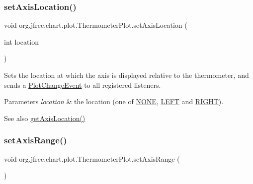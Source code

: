 \subsubsection{\texorpdfstring{set\+Axis\+Location()}{setAxisLocation()}}
{\footnotesize\ttfamily void org.\+jfree.\+chart.\+plot.\+Thermometer\+Plot.\+set\+Axis\+Location (\begin{DoxyParamCaption}\item[{int}]{location }\end{DoxyParamCaption})}

Sets the location at which the axis is displayed relative to the thermometer, and sends a \mbox{\hyperlink{}{Plot\+Change\+Event}} to all registered listeners.


\begin{DoxyParams}{Parameters}
{\em location} & the location (one of \mbox{\hyperlink{classorg_1_1jfree_1_1chart_1_1plot_1_1_thermometer_plot_a5c5c2eaa1e5ec2630b9eb6e7735c4935}{N\+O\+NE}}, \mbox{\hyperlink{classorg_1_1jfree_1_1chart_1_1plot_1_1_thermometer_plot_aad7899a73457ebc2310a5df7d51c626a}{L\+E\+FT}} and \mbox{\hyperlink{classorg_1_1jfree_1_1chart_1_1plot_1_1_thermometer_plot_a2010a6ea7e1a8a5b523673d169b86a5d}{R\+I\+G\+HT}}).\\
\hline
\end{DoxyParams}
\begin{DoxySeeAlso}{See also}
\mbox{\hyperlink{classorg_1_1jfree_1_1chart_1_1plot_1_1_thermometer_plot_a7d7e825ca604808c95356ca8859f849f}{get\+Axis\+Location()}} 
\end{DoxySeeAlso}
\mbox{\label{classorg_1_1jfree_1_1chart_1_1plot_1_1_thermometer_plot_ae05c6ff862ff76c538e206db8d558832}} 
\subsubsection{\texorpdfstring{set\+Axis\+Range()}{setAxisRange()}}
{\footnotesize\ttfamily void org.\+jfree.\+chart.\+plot.\+Thermometer\+Plot.\+set\+Axis\+Range (\begin{DoxyParamCaption}{ }\end{DoxyParamCaption})\hspace{0.3cm}{\ttfamily [protected]}}

